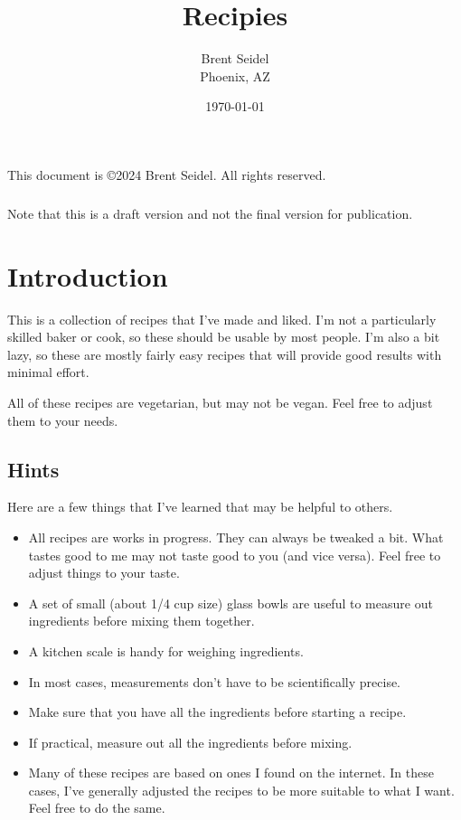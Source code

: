 \documentclass[10pt, openany]{book}
\title{Recipies}
\author{Brent Seidel \\ Phoenix, AZ}
\date{ \today }
\begin{document}
%
%
\frontmatter
\maketitle
\begin{center}
This document is \copyright 2024 Brent Seidel.  All rights reserved.

\paragraph{}Note that this is a draft version and not the final version for publication.
\end{center}
\tableofcontents

\mainmatter

\chapter{Introduction}
This is a collection of recipes that I've made and liked.  I'm not a particularly skilled baker or cook, so these should be usable by most people.  I'm also a bit lazy, so these are mostly fairly easy recipes that will provide good results with minimal effort.

All of these recipes are vegetarian, but may not be vegan.  Feel free to adjust them to your needs.

\section{Hints}
Here are a few things that I've learned that may be helpful to others.
\begin{itemize}
  \item All recipes are works in progress.  They can always be tweaked a bit.  What tastes good to me may not taste good to you (and vice versa).  Feel free to adjust things to your taste.
  \item A set of small (about 1/4 cup size) glass bowls are useful to measure out ingredients before mixing them together.
  \item A kitchen scale is handy for weighing ingredients.
  \item In most cases, measurements don't have to be scientifically precise.
  \item Make sure that you have all the ingredients before starting a recipe.
  \item If practical, measure out all the ingredients before mixing.
  \item Many of these recipes are based on ones I found on the internet.  In these cases, I've generally adjusted the recipes to be more suitable to what I want.  Feel free to do the same.
\end{itemize}
\end{document}
